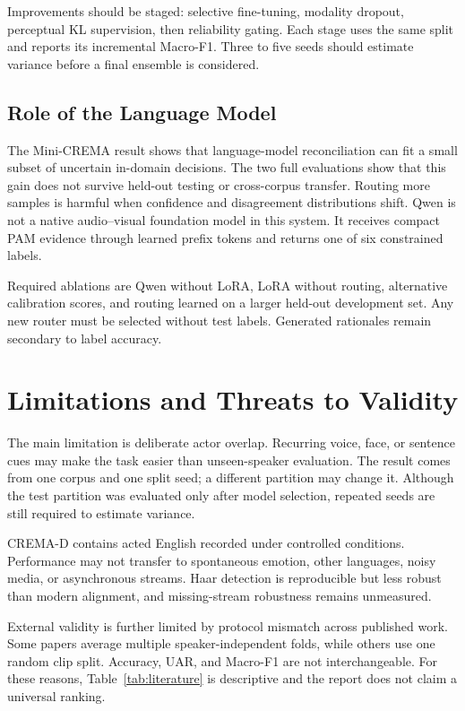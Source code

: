 \documentclass[conference]{IEEEtran}
\begin{document}
Improvements should be staged: selective fine-tuning, modality dropout,
perceptual KL supervision, then reliability gating. Each stage uses the same
split and reports its incremental Macro-F1. Three to five seeds should
estimate variance before a final ensemble is considered.

\subsection{Role of the Language Model}

The Mini-CREMA result shows that language-model reconciliation can fit a small
subset of uncertain in-domain decisions. The two full evaluations show that
this gain does not survive held-out testing or cross-corpus transfer. Routing
more samples is harmful when confidence and disagreement distributions shift.
Qwen is not a native audio--visual foundation model in this system. It receives
compact PAM evidence through learned prefix tokens and returns one of six
constrained labels.

Required ablations are Qwen without LoRA, LoRA without routing, alternative
calibration scores, and routing learned on a larger held-out development set.
Any new router must be selected without test labels. Generated rationales
remain secondary to label accuracy.

\section{Limitations and Threats to Validity}
\label{sec:limitations}

The main limitation is deliberate actor overlap. Recurring voice, face, or
sentence cues may make the task easier than unseen-speaker evaluation. The
result comes from one corpus and one split seed; a different partition may
change it. Although the test partition was evaluated only after model
selection, repeated seeds are still required to estimate variance.

CREMA-D contains acted English recorded under controlled conditions.
Performance may not transfer to spontaneous emotion, other languages, noisy
media, or asynchronous streams. Haar detection is reproducible but less robust
than modern alignment, and missing-stream robustness remains unmeasured.

External validity is further limited by protocol mismatch across published
work. Some papers average multiple speaker-independent folds, while others use
one random clip split. Accuracy, UAR, and Macro-F1 are not interchangeable.
For these reasons, Table~\ref{tab:literature} is descriptive and the report
does not claim a universal ranking.
\end{document}
